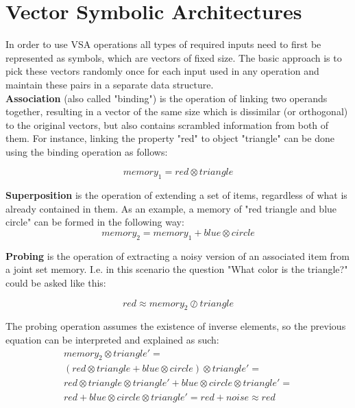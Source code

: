 \documentclass[journal]{journal}
\begin{document}
	\section{Vector Symbolic Architectures}
	
In order to use VSA operations all types of required inputs need to first be represented as symbols, which are vectors of fixed size. The basic approach is to pick these vectors randomly once for each input used in any operation and maintain these pairs in a separate data structure.	
	\\
	
	\textbf{Association} (also called "binding") is the operation of linking two operands together, resulting in a vector of the same size which is dissimilar (or orthogonal) to the original vectors, but also contains scrambled information from both of them.
For instance, linking the property "red" to object "triangle" can be done using the binding operation as follows:
	
	\begin{equation}
	memory_1 = red \otimes triangle
	\end{equation}
	
	\textbf{Superposition} is the operation of extending a set of items, regardless of what is already contained in them.
As an example, a memory of "red triangle and blue circle" can be formed in the following way:
	\begin{equation}
	memory_2 = memory_1 + blue \otimes circle
	\end{equation}
	
	\textbf{Probing} is the operation of extracting a noisy version of an associated item from a joint set memory.
I.e. in this scenario the question "What color is the triangle?" could be asked like this:
	
	\begin{equation}
	red \approx memory_2 \oslash triangle
	\end{equation}
	
	
	The probing operation assumes the existence of inverse elements, so the previous equation can be interpreted and explained as such:
	\begin{multline}
	memory_2 \otimes triangle'=\\
	(red \otimes triangle + blue \otimes circle) \otimes triangle'=\\
	red \otimes triangle  \otimes triangle' + blue \otimes circle \otimes triangle' =\\
	red + blue \otimes circle \otimes triangle'  = red + noise
	\approx red
	\end{multline}
	
\end{document}
